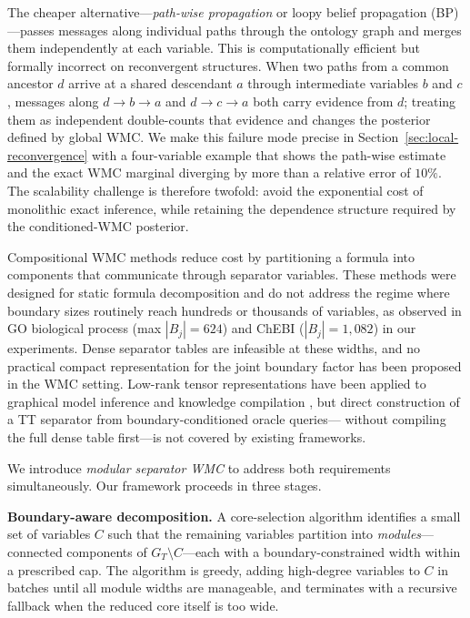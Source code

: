 The cheaper alternative---\emph{path-wise propagation} or loopy belief
propagation (BP) \citep{pearl1988probabilistic}---passes messages along
individual paths through the ontology graph and merges them
independently at each variable. This is computationally efficient but
formally incorrect on reconvergent structures. When two paths from
a common ancestor $d$ arrive at a shared descendant $a$ through
intermediate variables $b$ and $c$, messages along $d \to b \to a$
and $d \to c \to a$ both carry evidence from $d$; treating them as
independent double-counts that evidence and changes the posterior
defined by global WMC. We make this failure mode precise in
Section~\ref{sec:local-reconvergence} with a four-variable example
that shows the path-wise estimate and the exact WMC marginal diverging
by more than a relative error of $10\%$. The scalability challenge is
therefore twofold: avoid the exponential cost of monolithic exact
inference, while retaining the dependence structure required by the
conditioned-WMC posterior.

Compositional WMC methods \citep{dal2017partitioned,dal2021compositional}
reduce cost by partitioning a formula into components that communicate
through separator variables. These methods were designed for static
formula decomposition and do not address the regime where boundary sizes
routinely reach hundreds or thousands of variables, as observed in GO
biological process (max $|B_j| = 624$) and ChEBI ($|B_j| = 1{,}082$)
in our experiments. Dense separator tables are infeasible at these
widths, and no practical compact representation for the joint boundary
factor has been proposed in the WMC setting.
Low-rank tensor representations have been applied to graphical model
inference \citep{novikov2014mrf,wrigley2017tensorbp} and knowledge
compilation \citep{goral2024semiring,onaka2025ttkc}, but direct
construction of a TT separator from boundary-conditioned oracle queries---
without compiling the full dense table first---is not covered by
existing frameworks.

We introduce \emph{modular separator WMC} to address both requirements
simultaneously. Our framework proceeds in three stages.

\textbf{Boundary-aware decomposition.}
A core-selection algorithm identifies a small set of variables $C$ such
that the remaining variables partition into \emph{modules}---connected
components of $G_T \setminus C$---each with a boundary-constrained
width within a prescribed cap. The algorithm is greedy, adding
high-degree variables to $C$ in batches until all module widths are
manageable, and terminates with a recursive fallback when the reduced
core itself is too wide.

